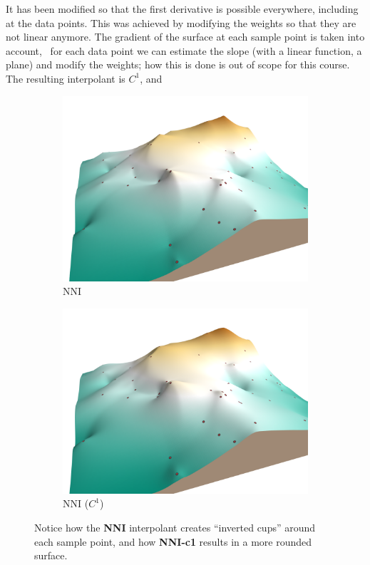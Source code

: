 It has been modified so that the first derivative is possible everywhere, including at the data points.
This was achieved by modifying the weights so that they are not linear anymore.
The gradient of the surface at each sample point is taken into account, \ie\ for each data point we can estimate the slope (with a linear function, a plane) and modify the weights; how this is done is out of scope for this course.
The resulting interpolant is $C^1$, and 
\begin{figure}
  \centering
  \begin{subfigure}[b]{0.5\linewidth}
    \centering
    \includegraphics[width=\textwidth]{figs/nni.png}
    \caption{NNI}
  \end{subfigure}%
  \begin{subfigure}[b]{0.5\linewidth}
    \centering
    \includegraphics[width=\textwidth]{figs/nni_c1.png}
    \caption{NNI ($C^1$)}
  \end{subfigure}
\caption{Notice how the \textbf{NNI} interpolant creates ``inverted cups'' around each sample point, and how \textbf{NNI-c1} results in a more rounded surface.}%
\end{figure}



